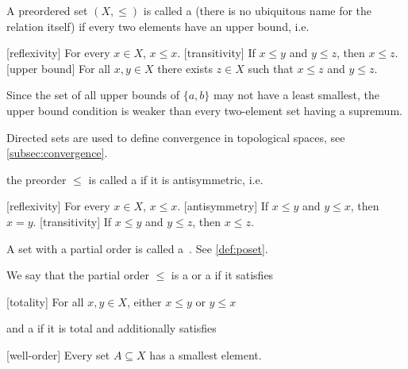 \begin{definition}
\begin{defenum}
    \cite[8]{Engelking1989} A preordered set \( (X, \leq) \) is called a  (there is no ubiquitous name for the relation itself) if every two elements have an upper bound, i.e.
    \begin{description}
      [reflexivity] For every \( x \in X \), \( x \leq x \).
      [transitivity] If \( x \leq y \) and \( y \leq z \), then \( x \leq z \).
      [upper bound] For all \( x, y \in X \) there exists \( z \in X \) such that \( x \leq z \) and \( y \leq z \).
    \end{description}

    Since the set of all upper bounds of \( \{ a, b \} \) may not have a least smallest, the upper bound condition is weaker than every two-element set having a supremum.

    Directed sets are used to define convergence in topological spaces, see \cref{subsec:convergence}.

    \cite[7]{Engelking1989} the preorder \( \leq \) is called a  if it is antisymmetric, i.e.
    \begin{description}
      [reflexivity] For every \( x \in X \), \( x \leq x \).
      [antisymmetry] If \( x \leq y \) and \( y \leq x \), then \( x = y \).
      [transitivity] If \( x \leq y \) and \( y \leq z \), then \( x \leq z \).
    \end{description}

    A set with a partial order is called a~. See \cref{def:poset}.

    We say that the partial order \( \leq \) is a  or a  if it satisfies
    \begin{description}
      [totality] For all \( x, y \in X \), either \( x \leq y \) or \( y \leq x \)
    \end{description}
    and a  if it is total and additionally satisfies
    \begin{description}
      [well-order] Every set \( A \subseteq X \) has a smallest element.
    \end{description}


\end{defenum}
\end{definition}
